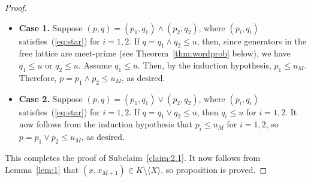 \begin{proof}
\begin{itemize}
\item {\bf Case 1.} Suppose $(p, q) = (p_1, q_1) \wedge (p_2, q_2)$, where 
  $(p_i, q_i)$ satisfies~(\ref{eq:star}) for $i = 1, 2$.    
  If $q= q_1 \wedge q_2 \leqslant u$, then, since generators in the free lattice are meet-prime (see Theorem~\ref{thm:wordprob} below), we have $q_1\leqslant u$ or $q_2\leqslant u$. Assume $q_1\leqslant u$.  Then, by the induction hypothesis, $p_1\leqslant u_M$.  Therefore, $p = p_1\wedge p_2 \leqslant u_M$, as desired.

\item {\bf Case 2.} Suppose $(p, q) = (p_1, q_1) \vee (p_2, q_2)$, where 
  $(p_i, q_i)$ satisfies~(\ref{eq:star}) for $i = 1, 2$.    
  If $q= q_1 \vee q_2 \leqslant u$, then 
  $q_i \leqslant u$ for $i = 1, 2$.
  It now follows from the induction hypothesis that $p_i\leqslant u_M$ for $i = 1, 2$, so 
  $p = p_1 \vee p_2 \leqslant u_M$, as desired.
\end{itemize}
This completes the proof of Subclaim~\ref{claim:2.1}. It now follows from Lemma~\ref{lem:1} that 
$(x, x_{M+1})\in K \setminus \langle X \rangle$, so proposition is proved.
\end{proof}


